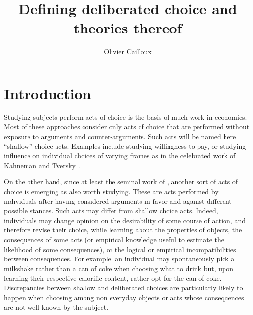 \documentclass[version=last, pagesize, twoside=off, bibliography=totoc, DIV=calc, fontsize=12pt, a4paper, french, english]{scrartcl}
\begin{document}
\title{Defining deliberated choice and theories thereof}
\author{Olivier Cailloux}
\makeatletter
{}
\makeatother
\maketitle

\section{Introduction}
Studying subjects perform acts of choice is the basis of much work in economics.
Most of these approaches consider only acts of choice that are performed without exposure to arguments and counter-arguments. Such acts will be named here “shallow” choice acts. 
Examples include studying willingness to pay, or studying influence on individual choices of varying frames as in the celebrated work of Kahneman and Tversky \citep{bell_descriptive_1988, kahneman_thinking_2012}.

On the other hand, since at least the seminal work of \citet{fishkin_when_2011}, another sort of acts of choice is emerging as also worth studying.
These are acts performed by individuals 
after having considered arguments in favor and against different possible stances. 
Such acts may differ from shallow choice acts. 
Indeed, individuals may change opinion on the desirability of some course of action, and therefore revise their choice, while learning about the properties of objects, the consequences of some acts (or empirical knowledge useful to estimate the likelihood of some consequences), or the logical or empirical incompatibilities between consequences. 
For example, an individual may spontaneously pick a milkshake rather than a can of coke when choosing what to drink but, upon learning their respective calorific content, rather opt for the can of coke.
Discrepancies between shallow and deliberated choices are particularly likely to happen when choosing among non everyday objects or acts whose consequences are not well known by the subject. 
\end{document}
